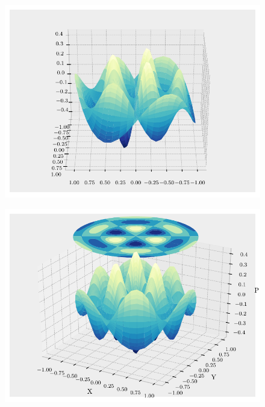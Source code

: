 \begin{frame}
    \begin{figure}[!]
        \centering
        \includegraphics{Radial_mode_analytical_test_case_3d1.pdf}
    \end{figure}
\end{frame}
\begin{frame}
    \begin{figure}[!]
        \centering
        \includegraphics{Radial_mode_analytical_test_case_3d2.pdf}
    \end{figure}
\end{frame}

